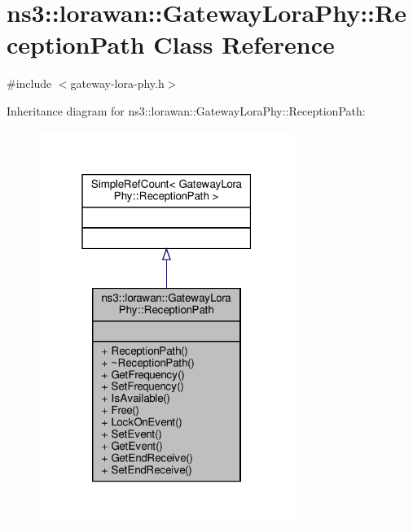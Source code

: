 \hypertarget{classns3_1_1lorawan_1_1GatewayLoraPhy_1_1ReceptionPath}{}\section{ns3\+:\+:lorawan\+:\+:Gateway\+Lora\+Phy\+:\+:Reception\+Path Class Reference}
\label{classns3_1_1lorawan_1_1GatewayLoraPhy_1_1ReceptionPath}


{\ttfamily \#include $<$gateway-\/lora-\/phy.\+h$>$}



Inheritance diagram for ns3\+:\+:lorawan\+:\+:Gateway\+Lora\+Phy\+:\+:Reception\+Path\+:
\nopagebreak
\begin{figure}[H]
\begin{center}
\leavevmode
\includegraphics[width=235pt]{classns3_1_1lorawan_1_1GatewayLoraPhy_1_1ReceptionPath__inherit__graph}
\end{center}
\end{figure}


